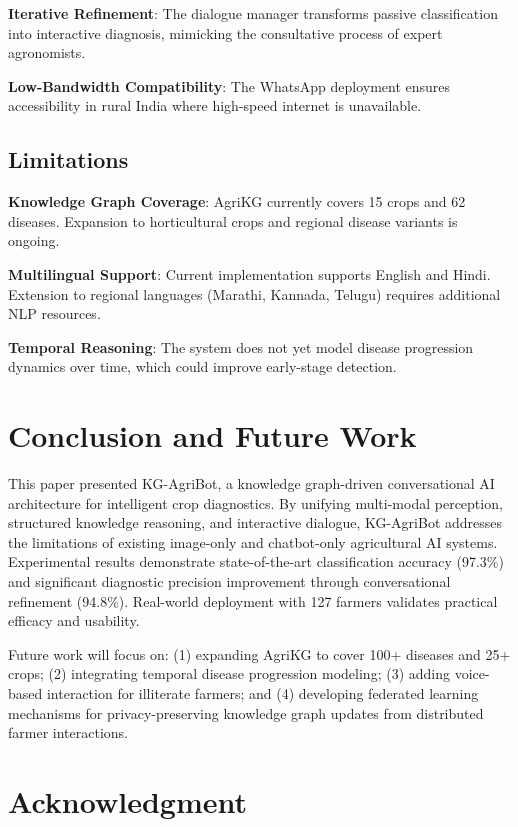 \documentclass[conference]{IEEEtran}
\begin{document}
\textbf{Iterative Refinement}: The dialogue manager transforms passive classification into interactive diagnosis, mimicking the consultative process of expert agronomists.

\textbf{Low-Bandwidth Compatibility}: The WhatsApp deployment ensures accessibility in rural India where high-speed internet is unavailable.

\subsection{Limitations}

\textbf{Knowledge Graph Coverage}: AgriKG currently covers 15 crops and 62 diseases. Expansion to horticultural crops and regional disease variants is ongoing.

\textbf{Multilingual Support}: Current implementation supports English and Hindi. Extension to regional languages (Marathi, Kannada, Telugu) requires additional NLP resources.

\textbf{Temporal Reasoning}: The system does not yet model disease progression dynamics over time, which could improve early-stage detection.

\section{Conclusion and Future Work}
\label{sec:conclusion}

This paper presented KG-AgriBot, a knowledge graph-driven conversational AI architecture for intelligent crop diagnostics. By unifying multi-modal perception, structured knowledge reasoning, and interactive dialogue, KG-AgriBot addresses the limitations of existing image-only and chatbot-only agricultural AI systems. Experimental results demonstrate state-of-the-art classification accuracy (97.3\%) and significant diagnostic precision improvement through conversational refinement (94.8\%). Real-world deployment with 127 farmers validates practical efficacy and usability.

Future work will focus on: (1) expanding AgriKG to cover 100+ diseases and 25+ crops; (2) integrating temporal disease progression modeling; (3) adding voice-based interaction for illiterate farmers; and (4) developing federated learning mechanisms for privacy-preserving knowledge graph updates from distributed farmer interactions.

\section*{Acknowledgment}
\end{document}
